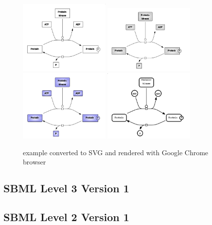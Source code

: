 \begin{figure}[!h]
\begin{center}
\includegraphics[width=0.4\textwidth]{figures/Phosphorylation_wireFrame}
\includegraphics[width=0.4\textwidth]{figures/Phosphorylation_gray}
\includegraphics[width=0.4\textwidth]{figures/Phosphorylation_color}
\includegraphics[width=0.4\textwidth]{figures/Phosphorylation_SBGN}
\end{center}
\caption{example converted to SVG and rendered with Google Chrome browser}
\label{ExampleRendering}
\end{figure}



\subsection*{SBML Level 3 Version 1}


\subsection*{SBML Level 2 Version 1}





